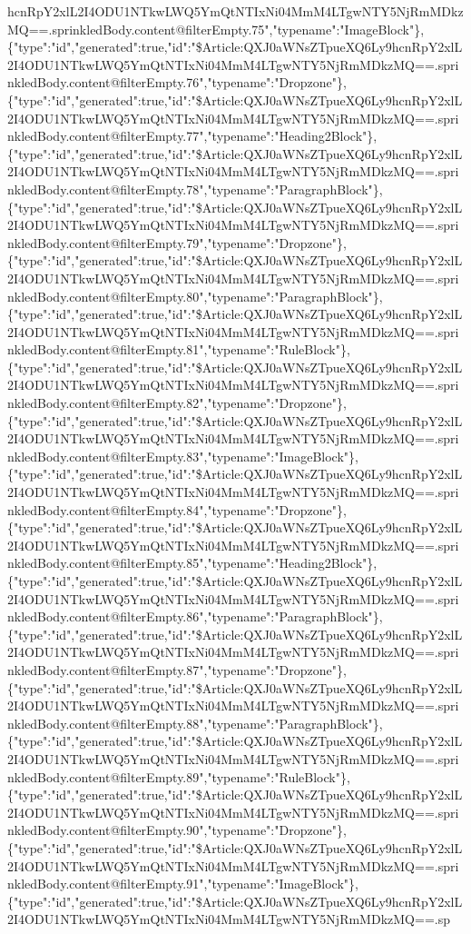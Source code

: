 hcnRpY2xlL2I4ODU1NTkwLWQ5YmQtNTIxNi04MmM4LTgwNTY5NjRmMDkzMQ==.sprinkledBody.content@filterEmpty.75","typename":"ImageBlock"\},\{"type":"id","generated":true,"id":"\$Article:QXJ0aWNsZTpueXQ6Ly9hcnRpY2xlL2I4ODU1NTkwLWQ5YmQtNTIxNi04MmM4LTgwNTY5NjRmMDkzMQ==.sprinkledBody.content@filterEmpty.76","typename":"Dropzone"\},\{"type":"id","generated":true,"id":"\$Article:QXJ0aWNsZTpueXQ6Ly9hcnRpY2xlL2I4ODU1NTkwLWQ5YmQtNTIxNi04MmM4LTgwNTY5NjRmMDkzMQ==.sprinkledBody.content@filterEmpty.77","typename":"Heading2Block"\},\{"type":"id","generated":true,"id":"\$Article:QXJ0aWNsZTpueXQ6Ly9hcnRpY2xlL2I4ODU1NTkwLWQ5YmQtNTIxNi04MmM4LTgwNTY5NjRmMDkzMQ==.sprinkledBody.content@filterEmpty.78","typename":"ParagraphBlock"\},\{"type":"id","generated":true,"id":"\$Article:QXJ0aWNsZTpueXQ6Ly9hcnRpY2xlL2I4ODU1NTkwLWQ5YmQtNTIxNi04MmM4LTgwNTY5NjRmMDkzMQ==.sprinkledBody.content@filterEmpty.79","typename":"Dropzone"\},\{"type":"id","generated":true,"id":"\$Article:QXJ0aWNsZTpueXQ6Ly9hcnRpY2xlL2I4ODU1NTkwLWQ5YmQtNTIxNi04MmM4LTgwNTY5NjRmMDkzMQ==.sprinkledBody.content@filterEmpty.80","typename":"ParagraphBlock"\},\{"type":"id","generated":true,"id":"\$Article:QXJ0aWNsZTpueXQ6Ly9hcnRpY2xlL2I4ODU1NTkwLWQ5YmQtNTIxNi04MmM4LTgwNTY5NjRmMDkzMQ==.sprinkledBody.content@filterEmpty.81","typename":"RuleBlock"\},\{"type":"id","generated":true,"id":"\$Article:QXJ0aWNsZTpueXQ6Ly9hcnRpY2xlL2I4ODU1NTkwLWQ5YmQtNTIxNi04MmM4LTgwNTY5NjRmMDkzMQ==.sprinkledBody.content@filterEmpty.82","typename":"Dropzone"\},\{"type":"id","generated":true,"id":"\$Article:QXJ0aWNsZTpueXQ6Ly9hcnRpY2xlL2I4ODU1NTkwLWQ5YmQtNTIxNi04MmM4LTgwNTY5NjRmMDkzMQ==.sprinkledBody.content@filterEmpty.83","typename":"ImageBlock"\},\{"type":"id","generated":true,"id":"\$Article:QXJ0aWNsZTpueXQ6Ly9hcnRpY2xlL2I4ODU1NTkwLWQ5YmQtNTIxNi04MmM4LTgwNTY5NjRmMDkzMQ==.sprinkledBody.content@filterEmpty.84","typename":"Dropzone"\},\{"type":"id","generated":true,"id":"\$Article:QXJ0aWNsZTpueXQ6Ly9hcnRpY2xlL2I4ODU1NTkwLWQ5YmQtNTIxNi04MmM4LTgwNTY5NjRmMDkzMQ==.sprinkledBody.content@filterEmpty.85","typename":"Heading2Block"\},\{"type":"id","generated":true,"id":"\$Article:QXJ0aWNsZTpueXQ6Ly9hcnRpY2xlL2I4ODU1NTkwLWQ5YmQtNTIxNi04MmM4LTgwNTY5NjRmMDkzMQ==.sprinkledBody.content@filterEmpty.86","typename":"ParagraphBlock"\},\{"type":"id","generated":true,"id":"\$Article:QXJ0aWNsZTpueXQ6Ly9hcnRpY2xlL2I4ODU1NTkwLWQ5YmQtNTIxNi04MmM4LTgwNTY5NjRmMDkzMQ==.sprinkledBody.content@filterEmpty.87","typename":"Dropzone"\},\{"type":"id","generated":true,"id":"\$Article:QXJ0aWNsZTpueXQ6Ly9hcnRpY2xlL2I4ODU1NTkwLWQ5YmQtNTIxNi04MmM4LTgwNTY5NjRmMDkzMQ==.sprinkledBody.content@filterEmpty.88","typename":"ParagraphBlock"\},\{"type":"id","generated":true,"id":"\$Article:QXJ0aWNsZTpueXQ6Ly9hcnRpY2xlL2I4ODU1NTkwLWQ5YmQtNTIxNi04MmM4LTgwNTY5NjRmMDkzMQ==.sprinkledBody.content@filterEmpty.89","typename":"RuleBlock"\},\{"type":"id","generated":true,"id":"\$Article:QXJ0aWNsZTpueXQ6Ly9hcnRpY2xlL2I4ODU1NTkwLWQ5YmQtNTIxNi04MmM4LTgwNTY5NjRmMDkzMQ==.sprinkledBody.content@filterEmpty.90","typename":"Dropzone"\},\{"type":"id","generated":true,"id":"\$Article:QXJ0aWNsZTpueXQ6Ly9hcnRpY2xlL2I4ODU1NTkwLWQ5YmQtNTIxNi04MmM4LTgwNTY5NjRmMDkzMQ==.sprinkledBody.content@filterEmpty.91","typename":"ImageBlock"\},\{"type":"id","generated":true,"id":"\$Article:QXJ0aWNsZTpueXQ6Ly9hcnRpY2xlL2I4ODU1NTkwLWQ5YmQtNTIxNi04MmM4LTgwNTY5NjRmMDkzMQ==.sp